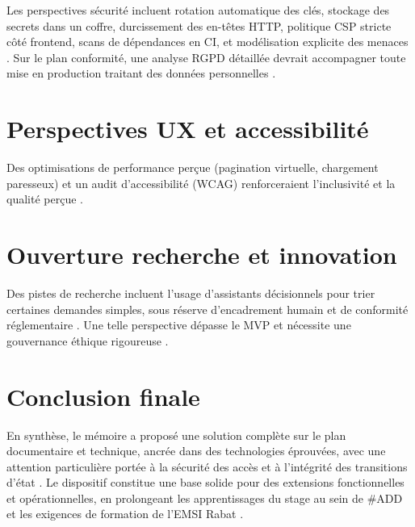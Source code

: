 Les perspectives sécurité incluent rotation automatique des clés, stockage des secrets dans un coffre, durcissement des en-têtes HTTP, politique CSP stricte côté frontend, scans de dépendances en CI, et modélisation explicite des menaces \cite{owasp2021}. Sur le plan conformité, une analyse RGPD détaillée devrait accompagner toute mise en production traitant des données personnelles \cite{iso25010}.

\section{Perspectives UX et accessibilité}

Des optimisations de performance perçue (pagination virtuelle, chargement paresseux) et un audit d'accessibilité (WCAG) renforceraient l'inclusivité et la qualité perçue \cite{pressman2014,iso25010}.

\section{Ouverture recherche et innovation}

Des pistes de recherche incluent l'usage d'assistants décisionnels pour trier certaines demandes simples, sous réserve d'encadrement humain et de conformité réglementaire \cite{sommerville2016}. Une telle perspective dépasse le MVP et nécessite une gouvernance éthique rigoureuse \cite{iso25010}.

\section{Conclusion finale}

En synthèse, le mémoire a proposé une solution complète sur le plan documentaire et technique, ancrée dans des technologies éprouvées, avec une attention particulière portée à la sécurité des accès et à l'intégrité des transitions d'état \cite{owasp2021,date2003}. Le dispositif constitue une base solide pour des extensions fonctionnelles et opérationnelles, en prolongeant les apprentissages du stage au sein de \#ADD et les exigences de formation de l'EMSI Rabat \cite{bass2021,sommerville2016}.
